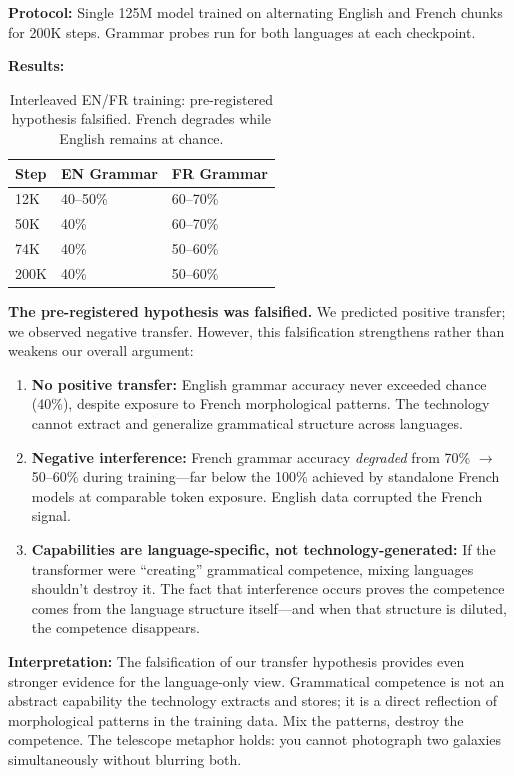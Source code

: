 \documentclass[11pt,a4paper]{article}
\begin{document}
\textbf{Protocol:} Single 125M model trained on alternating English and French chunks for 200K steps. Grammar probes run for both languages at each checkpoint.

\textbf{Results:}

\begin{table}[h]
\centering
\begin{tabular}{lll}
\toprule
Step & EN Grammar & FR Grammar \\
\midrule
12K & 40--50\% & 60--70\% \\
50K & 40\% & 60--70\% \\
74K & 40\% & 50--60\% \\
200K & 40\% & 50--60\% \\
\bottomrule
\end{tabular}
\caption{Interleaved EN/FR training: pre-registered hypothesis falsified. French degrades while English remains at chance.}
\label{tab:interleaved}
\end{table}

\textbf{The pre-registered hypothesis was falsified.} We predicted positive transfer; we observed negative transfer. However, this falsification strengthens rather than weakens our overall argument:

\begin{enumerate}
    \item \textbf{No positive transfer:} English grammar accuracy never exceeded chance (40\%), despite exposure to French morphological patterns. The technology cannot extract and generalize grammatical structure across languages.

    \item \textbf{Negative interference:} French grammar accuracy \textit{degraded} from 70\% $\rightarrow$ 50--60\% during training---far below the 100\% achieved by standalone French models at comparable token exposure. English data corrupted the French signal.

    \item \textbf{Capabilities are language-specific, not technology-generated:} If the transformer were ``creating'' grammatical competence, mixing languages shouldn't destroy it. The fact that interference occurs proves the competence comes from the language structure itself---and when that structure is diluted, the competence disappears.
\end{enumerate}

\textbf{Interpretation:} The falsification of our transfer hypothesis provides even stronger evidence for the language-only view. Grammatical competence is not an abstract capability the technology extracts and stores; it is a direct reflection of morphological patterns in the training data. Mix the patterns, destroy the competence. The telescope metaphor holds: you cannot photograph two galaxies simultaneously without blurring both.
\end{document}
